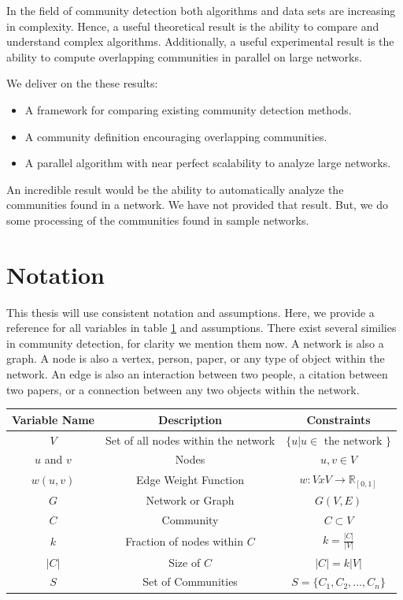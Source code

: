 \documentclass[phd,tocprelim]{cornell}
\renewcommand{\caption}[1]{\singlespacing\hangcaption{#1}\normalspacing}
\begin{document}
In the field of community detection both algorithms and data sets are increasing in complexity.  Hence, a useful theoretical result is the ability to compare and understand complex algorithms.  Additionally, a useful experimental result is the ability to compute overlapping communities in parallel on large networks.

We deliver on the these results:
\begin{itemize}
\item A framework for comparing existing community detection methods.
\item A community definition encouraging overlapping communities.
\item A parallel algorithm with near perfect scalability to analyze large networks.
\end{itemize}

An incredible result would be the ability to automatically analyze the communities found in a network.  We have not provided that result.  But, we do some processing of the communities found in sample networks.


\section{Notation}

This thesis will use consistent notation and assumptions.  Here, we provide a reference for all variables in table \ref{table_variables} and assumptions.  There exist several similies in community detection, for clarity we mention them now.  A network is also a graph.  A node is also a vertex, person, paper, or any type of object within the network.  An edge is also an interaction between two people, a citation between two papers, or a connection between any two objects within the network.

\begin{table}[ht]
\caption{Notation}
\begin{center}
\begin{tabular}{|c|c|c|} \hline
Variable Name & Description & Constraints \\ \hline
$V$ & Set of all nodes within the network & $\{u | u \in \mbox{ the network }\}$\\ \hline
$u$ and $v$ & Nodes & $u, v \in V$ \\ \hline
$w(u,v)$ & Edge Weight Function &  $w:VxV \rightarrow \mathbb{R} _{[0, 1]}$ \\ \hline
$G$ & Network or Graph & $G(V,E)$ \\ \hline
$C$ & Community & $C \subset V$ \\ \hline
$k$ & Fraction of nodes within $C$ & $k = \frac{|C|}{|V|}$ \\ \hline
$|C|$ & Size of $C$ & $|C| = k|V |$ \\ \hline
$S$ & Set of Communities & $S = \{C_1,C_2,\dots,C_n\}$\\ \hline
\end{tabular}
\end{center}
\label{table_variables}
\end{table}
\end{document}
